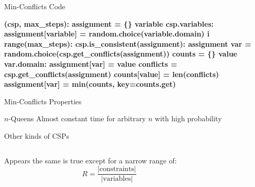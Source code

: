 \documentclass[14pt]{beamer}
\begin{document}
\begin{frame}[fragile]{Min-Conflicts Code}
	\scriptsize
	\begin{semiverbatim}\bfseries
		 (csp, max_steps):
		    \pause{}
		    assignment = \{\}
		     variable  csp.variables:
		        assignment[variable] = random.choice(variable.domain)
		    \pause{}
		     i  range(max_steps):
		        \pause{}
		         csp.is_consistent(assignment):
		             assignment
		        \pause{}
		        var = random.choice(csp.get_conflicts(assignment))
		        \pause{}
		        counts = \{\}
		         value  var.domain:
		            assignment[var] = value
		            conflicts = csp.get_conflicts(assignment)
		            counts[value] = len(conflicts)
		        assignment[var] = min(counts, key=counts.get)
		    \pause{}
		     
	\end{semiverbatim}
\end{frame}
\begin{frame}{Min-Conflicts Properties}
	\begin{block}{$n$-Queens}
		Almost constant time for arbitrary $n$ with high probability
	\end{block}
	\pause
	\begin{block}{Other kinds of CSPs}
		\begin{columns}
			\begin{column}{1.5in}
				Appears the same is true except for a narrow range of:
				\[
					R = \frac{\left|\mbox{constraints}\right|}{\left|\mbox{variables}\right|}
				\]
			\end{column}
			\begin{column}{2in}
				\begin{center}
				\end{center}
			\end{column}
		\end{columns}
	\end{block}
\end{frame}
\end{document}

